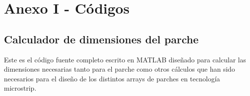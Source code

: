 

\chapter{Anexo I - Códigos}
\label{codigos}


\section{Calculador de dimensiones del parche}
\par Este es el código fuente completo escrito en MATLAB diseñado para calcular las dimensiones necesarias tanto para el parche como otros cálculos que han sido necesarios para el diseño de los distintos arrays de parches en tecnología microstrip. 
\\
